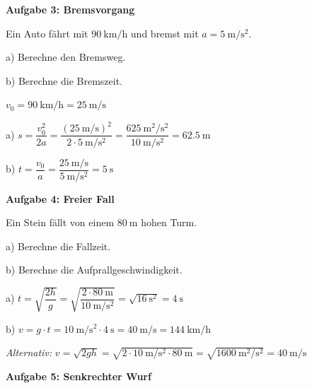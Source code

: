 \documentclass[11pt, a4paper]{article}
\begin{document}
\vspace{0.5em}

\textbf{Aufgabe 3: Bremsvorgang}

Ein Auto fährt mit $\SI{90}{\kilo\metre\per\hour}$ und bremst mit $a = \SI{5}{\metre\per\second\squared}$.

a) Berechne den Bremsweg.

b) Berechne die Bremszeit.

\begin{tcolorbox}[colback=hellgrau, colframe=grau, boxrule=0.5pt, title=Lösung]
$v_0 = \SI{90}{\kilo\metre\per\hour} = \SI{25}{\metre\per\second}$

a) $s = \dfrac{v_0^2}{2a} = \dfrac{(\SI{25}{\metre\per\second})^2}{2 \cdot \SI{5}{\metre\per\second\squared}} = \dfrac{\SI{625}{\metre\squared\per\second\squared}}{\SI{10}{\metre\per\second\squared}} = \SI{62,5}{\metre}$

b) $t = \dfrac{v_0}{a} = \dfrac{\SI{25}{\metre\per\second}}{\SI{5}{\metre\per\second\squared}} = \SI{5}{\second}$
\end{tcolorbox}

\vspace{0.5em}

\textbf{Aufgabe 4: Freier Fall}

Ein Stein fällt von einem $\SI{80}{\metre}$ hohen Turm.

a) Berechne die Fallzeit.

b) Berechne die Aufprallgeschwindigkeit.

\begin{tcolorbox}[colback=hellgrau, colframe=grau, boxrule=0.5pt, title=Lösung (Kopfrechnen mit $g \approx \SI{10}{\metre\per\second\squared}$)]
a) $t = \sqrt{\dfrac{2h}{g}} = \sqrt{\dfrac{2 \cdot \SI{80}{\metre}}{\SI{10}{\metre\per\second\squared}}} = \sqrt{\SI{16}{\second\squared}} = \SI{4}{\second}$

b) $v = g \cdot t = \SI{10}{\metre\per\second\squared} \cdot \SI{4}{\second} = \SI{40}{\metre\per\second} = \SI{144}{\kilo\metre\per\hour}$

\textit{Alternativ:} $v = \sqrt{2gh} = \sqrt{2 \cdot \SI{10}{\metre\per\second\squared} \cdot \SI{80}{\metre}} = \sqrt{\SI{1600}{\metre\squared\per\second\squared}} = \SI{40}{\metre\per\second}$
\end{tcolorbox}

\vspace{0.5em}

\textbf{Aufgabe 5: Senkrechter Wurf}
\end{document}

